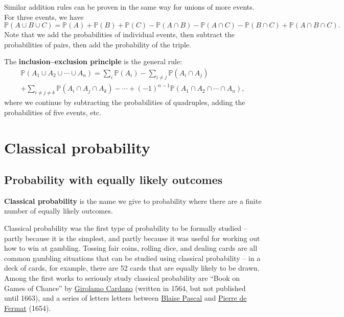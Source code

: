 \documentclass[
  a4paper,
]{book}
\theoremstyle{definition}
\theoremstyle{definition}
\theoremstyle{definition}
\theoremstyle{remark}
\begin{document}
Similar addition rules can be proven in the same way for unions of more events. For three events, we have
\[
  \mathbb P(A \cup B \cup C) = \mathbb P(A) + \mathbb P(B) + \mathbb P(C) 
  - \mathbb P(A \cap B) - \mathbb P(A \cap C) - \mathbb P(B \cap C) + \mathbb P(A \cap B \cap C) .
\]
Note that we add the probabilities of individual events, then subtract the probabilities of pairs, then add the probability of the triple.

The \textbf{inclusion--exclusion principle} is the general rule:
\begin{multline*} \mathbb P(A_1 \cup A_2 \cup \cdots \cup A_n)
  = \sum_i \mathbb P(A_i)
    - \sum_{i \neq j} \mathbb P(A_i \cap A_j) \\
    + \sum_{i \neq j \neq k} \mathbb P(A_i \cap A_j \cap A_k)
    - \cdots
    + (-1)^{n-1} \mathbb P(A_1 \cap A_2 \cap \cdots \cap A_n) , \end{multline*}
where we continue by subtracting the probabilities of quadruples, adding the probabilities of five events, etc.

\hypertarget{S03-classical}{%
\chapter{Classical probability}\label{S03-classical}}

\hypertarget{classical-intro}{%
\section{Probability with equally likely outcomes}\label{classical-intro}}

\textbf{Classical probability} is the name we give to probability where there are a finite number of equally likely outcomes.

Classical probability was the first type of probability to be formally studied -- partly because it is the simplest, and partly because it was useful for working out how to win at gambling. Tossing fair coins, rolling dice, and dealing cards are all common gambling situations that can be studied using classical probability -- in a deck of cards, for example, there are 52 cards that are equally likely to be drawn. Among the first works to seriously study classical probability are ``Book on Games of Chance'' by \href{https://mathshistory.st-andrews.ac.uk/Biographies/Cardan/}{Girolamo Cardano} (written in 1564, but not published until 1663), and a series of letters letters between \href{https://mathshistory.st-andrews.ac.uk/Biographies/Pascal/}{Blaise Pascal} and \href{https://mathshistory.st-andrews.ac.uk/Biographies/Fermat/}{Pierre de Fermat} (1654).
\end{document}

